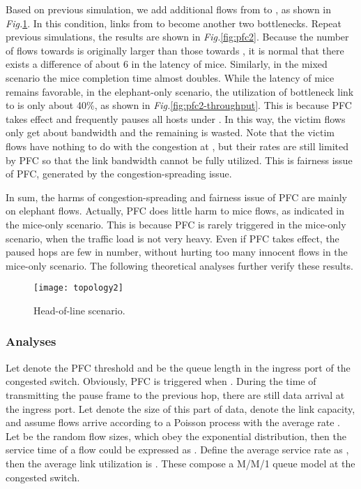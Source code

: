 \documentclass[]{sig-alternate-10pt}
\begin{document}
Based on previous simulation, we add additional flows from  to , as shown in \emph{Fig.}\ref{fig:topology2}.
In this condition, links from  to  become another two bottlenecks.
Repeat previous simulations, the results are shown in \emph{Fig.}\ref{fig:pfc2}.
Because the number of flows towards  is originally larger than those towards , it is normal that there exists a difference of about 6 in the latency of mice.
Similarly, in the mixed scenario the mice completion time almost doubles.
While the latency of mice remains favorable, in the elephant-only scenario, the utilization of bottleneck link  to  is only about 40\%, as shown in \emph{Fig.}\ref{fig:pfc2-throughput}.
This is because PFC takes effect and frequently pauses all hosts under .
In this way, the victim flows only get about  bandwidth and the remaining  is wasted.
Note that the victim flows have nothing to do with the congestion at , but their rates are still limited by PFC so that the link bandwidth cannot be fully utilized.
This is fairness issue of PFC, generated by the congestion-spreading issue.


In sum, the harms of congestion-spreading and fairness issue of PFC are mainly on elephant flows. Actually, PFC does little harm to mice flows, as indicated in the mice-only scenario. This is because PFC is rarely triggered in the mice-only scenario, when the traffic load is not very heavy. Even if PFC takes effect, the paused hops are few in number, without hurting too many innocent flows in the mice-only scenario. The following theoretical analyses further verify these results.

\begin{figure}[t]
	\centering
	\texttt{[image: topology2]}
	\caption{Head-of-line scenario.}
	\label{fig:topology2}
\end{figure}


\subsubsection{Analyses}

Let  denote the PFC threshold and  be the queue length in the ingress port of the congested switch. Obviously, PFC is triggered when . During the time of transmitting the pause frame to the previous hop, there are still data arrival at the ingress port. Let  denote the size of this part of data,  denote the link capacity, and assume flows arrive according to a Poisson process with the average rate . Let  be the random flow sizes, which obey the exponential distribution, then the service time of a flow could be expressed as .
Define the average service rate as , then the average link utilization is . These compose a M/M/1 queue model at the congested switch.
\end{document}
